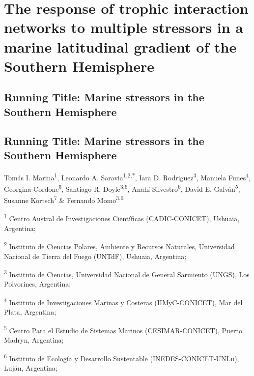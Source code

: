 \documentclass[
]{article}
\author{}
\date{\vspace{-2.5em}}
\begin{document}
\hypertarget{the-response-of-trophic-interaction-networks-to-multiple-stressors-in-a-marine-latitudinal-gradient-of-the-southern-hemisphere}{%
\section{The response of trophic interaction networks to multiple
stressors in a marine latitudinal gradient of the Southern
Hemisphere}\label{the-response-of-trophic-interaction-networks-to-multiple-stressors-in-a-marine-latitudinal-gradient-of-the-southern-hemisphere}}

\hypertarget{running-title-marine-stressors-in-the-southern-hemisphere}{%
\subsection{Running Title: Marine stressors in the Southern
Hemisphere}\label{running-title-marine-stressors-in-the-southern-hemisphere}}

\subsection{Running Title: Marine stressors in the Southern
Hemisphere}\label{running-title-marine-stressors-in-the-southern-hemisphere}

Tomás I. Marina\textsuperscript{1}, Leonardo A.
Saravia\textsuperscript{1,2,*}, Iara D. Rodriguez\textsuperscript{3},
Manuela Funes\textsuperscript{4}, Georgina Cordone\textsuperscript{5},
Santiago R. Doyle\textsuperscript{3,6}, Anahí
Silvestro\textsuperscript{6}, David E. Galván\textsuperscript{5},
Susanne Kortsch\textsuperscript{7} \& Fernando Momo\textsuperscript{3,6}

\textsuperscript{1} Centro Austral de Investigaciones Científicas
(CADIC-CONICET), Ushuaia, Argentina;

\textsuperscript{2} Instituto de Ciencias Polares, Ambiente y Recursos
Naturales, Universidad Nacional de Tierra del Fuego (UNTdF), Ushuaia,
Argentina;

\textsuperscript{3} Instituto de Ciencias, Universidad Nacional de
General Sarmiento (UNGS), Los Polvorines, Argentina;

\textsuperscript{4} Instituto de Investigaciones Marinas y Costeras
(IIMyC-CONICET), Mar del Plata, Argentina;

\textsuperscript{5} Centro Para el Estudio de Sistemas Marinos
(CESIMAR-CONICET), Puerto Madryn, Argentina;

\textsuperscript{6} Instituto de Ecología y Desarrollo Sustentable
(INEDES-CONICET-UNLu), Luján, Argentina;
\end{document}
